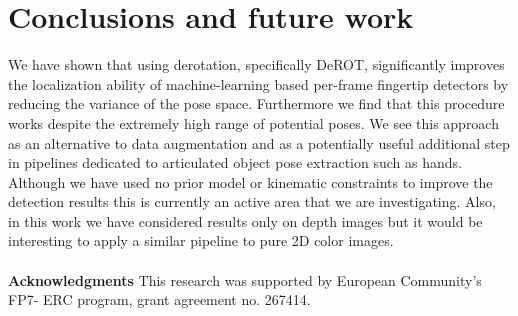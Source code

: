 \documentclass{bmvc2k}
\begin{document}
\section{Conclusions and future work}\label{sec:conclusion}
We have shown that using derotation, specifically DeROT, significantly improves the localization ability of machine-learning based per-frame fingertip detectors by reducing the variance of the pose space. Furthermore we find that this procedure works despite the extremely high range of potential poses. We see this approach as an alternative to data augmentation and as a potentially useful additional step in pipelines dedicated to articulated object pose extraction such as hands. Although we have used no prior model or kinematic constraints to improve the detection results this is currently an active area that we are investigating. Also, in this work we have considered results only on depth images but it would be interesting to apply a similar pipeline to pure 2D color images. 
\\\\
\textbf{Acknowledgments}
This research was supported by European Community's FP7- ERC program, grant agreement no. 267414.


\end{document}
